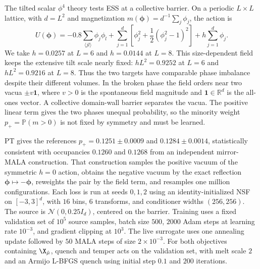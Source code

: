 \documentclass{article}
\begin{document}
The tilted scalar $\phi^4$ theory tests ESS at a collective barrier. On a periodic $L\times L$ lattice, with $d=L^2$ and magnetization $m(\boldsymbol\phi)=d^{-1}\sum_j\phi_j$, the action is
\begin{equation*}
U(\boldsymbol\phi)
=-0.8\sum_{\langle jl\rangle}\phi_j\phi_l
+\sum_{j=1}^{d}\left[\phi_j^2+\frac12(\phi_j^2-1)^2\right]
+h\sum_{j=1}^{d}\phi_j.
\end{equation*}
We take $h=0.0257$ at $L=6$ and $h=0.0144$ at $L=8$. This size-dependent
field keeps the extensive tilt scale nearly fixed:
$hL^2=0.9252$ at $L=6$ and $hL^2=0.9216$ at $L=8$. Thus the two targets have
comparable phase imbalance despite their different volumes.
In the broken phase the field orders near two vacua $\pm v\mathbf 1$, where $v>0$ is the spontaneous field magnitude and $\mathbf 1\in\mathbb R^d$ is the all-ones vector. A collective domain-wall barrier separates the vacua. The positive linear term gives the two phases unequal probability, so the minority weight $p_+=\mathbb P(m>0)$ is not fixed by symmetry and must be learned.

PT gives the references $p_+=0.1251\pm0.0009$ and $0.1284\pm0.0014$, statistically consistent with occupancies $0.1260$ and $0.1268$ from an independent mirror-MALA construction. That construction samples the positive vacuum of the symmetric $h=0$ action, obtains the negative vacuum by the exact reflection $\boldsymbol\phi\mapsto-\boldsymbol\phi$, reweights the pair by the field term, and resamples one million configurations. Each loss is run at seeds $0,1,2$ using an identity-initialized NSF on $[-3,3]^d$, with $16$ bins, $6$ transforms, and conditioner widths $(256,256)$. The source is $\mathcal N(0,0.25I_d)$, centered on the barrier. Training uses a fixed validation set of $10^5$ source samples, batch size $500$, $2000$ Adam steps at learning rate $10^{-3}$, and gradient clipping at $10^3$. The live surrogate uses one annealing update followed by $50$ MALA steps of size $2\times10^{-3}$. For both objectives containing $\X_{\hat\mu}$, quench and temper acts on the validation set, with melt scale $2$ and an Armijo L-BFGS quench using initial step $0.1$ and $200$ iterations.
\end{document}
